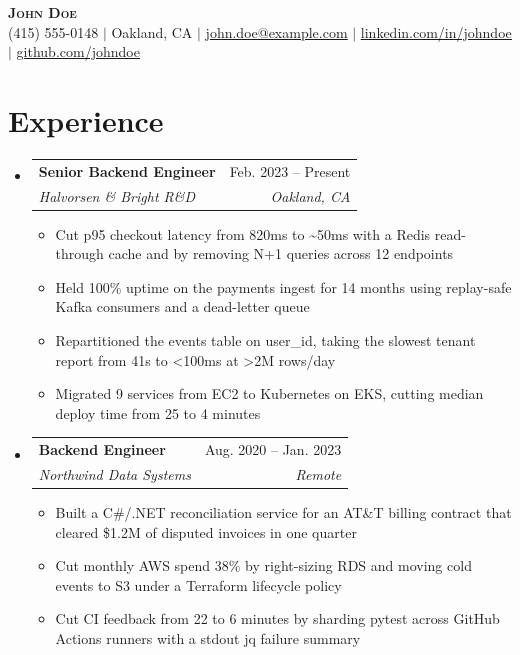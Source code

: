 \documentclass[letterpaper,11pt]{article}
\makeatletter
\newcommand{\resumeItem}[1]{
  \item\small{
    {#1 \vspace{-2pt}}
  }
}
\newcommand{\resumeSubheading}[4]{
  \vspace{-2pt}\item
    \begin{tabular*}{0.97\textwidth}[t]{l@{\extracolsep{\fill}}r}
      \textbf{#1} & #2 \\
      \textit{\small#3} & \textit{\small #4} \\
    \end{tabular*}\vspace{-7pt}
}
\newcommand{\resumeSubHeadingListStart}{\begin{itemize}[leftmargin=0.15in, label={}]}
\newcommand{\resumeSubHeadingListEnd}{\end{itemize}}
\newcommand{\resumeItemListStart}{\begin{itemize}}
\newcommand{\resumeItemListEnd}{\end{itemize}\vspace{-5pt}}
\makeatother
\begin{document}
\begin{center}
    \textbf{\Huge \scshape John Doe} \\ \vspace{1pt}
    \small (415) 555-0148 $|$ Oakland, CA $|$
    \href{mailto:john.doe@example.com}{\underline{john.doe@example.com}}
    $|$ \href{https://linkedin.com/in/johndoe}{\underline{linkedin.com/in/johndoe}}
    $|$ \href{https://github.com/johndoe}{\underline{github.com/johndoe}}
\end{center}

%
\section{Experience}
  \resumeSubHeadingListStart
    \resumeSubheading
      {Senior Backend Engineer}{Feb. 2023 -- Present}
      {Halvorsen \& Bright R\&D}{Oakland, CA}
      \resumeItemListStart
        \resumeItem{Cut p95 checkout latency from 820ms to \textasciitilde{}50ms with a Redis read-through cache and by removing N+1 queries across 12 endpoints}
        \resumeItem{Held 100\% uptime on the payments ingest for 14 months using replay-safe Kafka consumers and a dead-letter queue}
        \resumeItem{Repartitioned the events table on user\_id, taking the slowest tenant report from 41s to \textless{}100ms at \textgreater{}2M rows/day}
        \resumeItem{Migrated 9 services from EC2 to Kubernetes on EKS, cutting median deploy time from 25 to 4 minutes}
      \resumeItemListEnd
    \resumeSubheading
      {Backend Engineer}{Aug. 2020 -- Jan. 2023}
      {Northwind Data Systems}{Remote}
      \resumeItemListStart
        \resumeItem{Built a C\#/.NET reconciliation service for an AT\&T billing contract that cleared \$1.2M of disputed invoices in one quarter}
        \resumeItem{Cut monthly AWS spend 38\% by right-sizing RDS and moving cold events to S3 under a Terraform lifecycle policy}
        \resumeItem{Cut CI feedback from 22 to 6 minutes by sharding pytest across GitHub Actions runners with a stdout \textbar{} jq failure summary}
      \resumeItemListEnd
  \resumeSubHeadingListEnd
\end{document}
